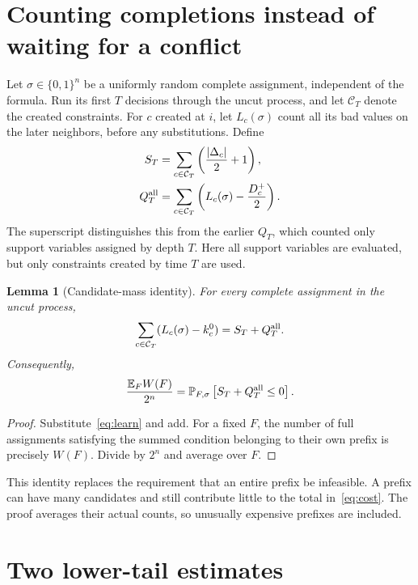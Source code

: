 \documentclass[11pt,a4paper]{article}
\newtheorem{lemma}[theorem]{Lemma}
\theoremstyle{remark}
\newcommand{\E}{\mathbb E}
\newcommand{\Prb}{\mathbb P}
\begin{document}
\section{Counting completions instead of waiting for a conflict}

Let $\sigma\in\{0,1\}^n$ be a uniformly random complete assignment,
independent of the formula. Run its first $T$ decisions through the
uncut process, and let $\mathcal C_T$ denote the created constraints.
For $c$ created at $i$, let $L_c(\sigma)$ count all its bad values on
the later neighbors, before any substitutions. Define
\begin{align}
 S_T&=\sum_{c\in\mathcal C_T}\left(\frac{|\Delta_c|}{2}+1\right),
                                                        \label{eq:S}\\
 Q_T^{\rm all}&=\sum_{c\in\mathcal C_T}
                 \left(L_c(\sigma)-\frac{D_c^+}{2}\right).
                                                        \label{eq:Q}
\end{align}
The superscript distinguishes this from the earlier $Q_T$, which counted
only support variables assigned by depth $T$. Here all support variables
are evaluated, but only constraints created by time $T$ are used.

\begin{lemma}[Candidate-mass identity]\label{lem:mass}
For every complete assignment in the uncut process,
\[
 \sum_{c\in\mathcal C_T}(L_c(\sigma)-k_c^0)
   =S_T+Q_T^{\rm all}.
\]
Consequently,
\begin{equation}
 \frac{\E_F W(F)}{2^n}
 =\Prb_{F,\sigma}\left[S_T+Q_T^{\rm all}\le0\right].
                                                        \label{eq:mass}
\end{equation}
\end{lemma}
\begin{proof}
Substitute~\eqref{eq:learn} and add. For a fixed $F$, the number of full
assignments satisfying the summed condition belonging to their own
prefix is precisely $W(F)$. Divide by $2^n$ and average over $F$.
\end{proof}

This identity replaces the requirement that an entire prefix be
infeasible. A prefix can have many candidates and still contribute
little to the total in~\eqref{eq:cost}. The proof averages their actual
counts, so unusually expensive prefixes are included.

\section{Two lower-tail estimates}
\end{document}
